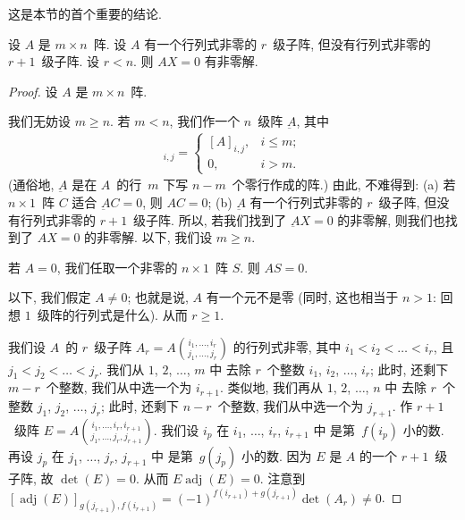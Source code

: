 这是本节的首个重要的结论.

\begin{theorem}
    设 \(A\) 是 \(m \times n\)~阵.
    设 \(A\) 有一个行列式非零的 \(r\)~级子阵,
    但没有行列式非零的 \(r+1\)~级子阵.
    设 \(r < n\).
    则 \(AX = 0\) 有非零解.
\end{theorem}

\begin{proof}
    设 \(A\) 是 \(m \times n\)~阵.

    我们无妨设 \(m \geq n\).
    若 \(m < n\), 我们作一个 \(n\)~级阵 \(\underbar{A}\),
    其中
    \begin{align*}
        [\underbar{A}]_{i,j}
        = \begin{cases}
              [A]_{i,j}, & i \leq m; \\
              0,         & i > m.
          \end{cases}
    \end{align*}
    (通俗地, \(\underbar{A}\)
    是在 \(A\)~的行~\(m\) 下写 \(n-m\)~个零行作成的阵.)
    由此, 不难得到:
    (a)
    若 \(n \times 1\)~阵 \(C\) 适合 \(\underbar{A}C = 0\),
    则 \(AC = 0\);
    (b)
    \(\underbar{A}\) 有一个行列式非零的 \(r\)~级子阵,
    但没有行列式非零的 \(r+1\)~级子阵.
    所以, 若我们找到了 \(\underbar{A}X = 0\)
    的非零解,
    则我们也找到了 \(AX = 0\) 的非零解.
    以下, 我们设 \(m \geq n\).

    若 \(A = 0\),
    我们任取一个非零的 \(n \times 1\)~阵 \(S\).
    则 \(AS = 0\).

    以下, 我们假定 \(A \neq 0\);
    也就是说, \(A\) 有一个元不是零
    (同时, 这也相当于 \(n > 1\):
    回想 \(1\)~级阵的行列式是什么).
    从而 \(r \geq 1\).

    我们设 \(A\)~的 \(r\)~级子阵
    \(
    \displaystyle
    A_r = A\binom{i_1,\dots,i_r}{j_1,\dots,j_r}
    \)
    的行列式非零,
    其中 \(i_1 < i_2 < \dots < i_r\),
    且 \(j_1 < j_2 < \dots < j_r\).
    我们从 \(1\), \(2\), \(\dots\), \(m\) 中%
    去除 \(r\)~个整数
    \(i_1\), \(i_2\), \(\dots\), \(i_r\);
    此时, 还剩下 \(m-r\)~个整数,
    我们从中选一个为 \(i_{r+1}\).
    类似地,
    我们再从 \(1\), \(2\), \(\dots\), \(n\) 中%
    去除 \(r\)~个整数
    \(j_1\), \(j_2\), \(\dots\), \(j_r\);
    此时, 还剩下 \(n-r\)~个整数,
    我们从中选一个为 \(j_{r+1}\).
    作 \(r+1\)~级阵
    \(
    \displaystyle
    E =
    A\binom{i_1,\dots,i_r,i_{r+1}}
    {j_1,\dots,j_r,j_{r+1}}
    \).
    我们设 \(i_p\) 在
    \(i_1\), \(\dots\), \(i_r\), \(i_{r+1}\) 中%
    是第~\(f(i_p)\) 小的数.
    再设 \(j_p\) 在
    \(j_1\), \(\dots\), \(j_r\), \(j_{r+1}\) 中%
    是第~\(g(j_p)\) 小的数.
    因为 \(E\) 是 \(A\) 的一个 \(r+1\)~级子阵,
    故 \(\det {(E)} = 0\).
    从而
    \(E \operatorname{adj} {(E)} = 0\).
    注意到
    \([\operatorname{adj} {(E)}]_{g(j_{r+1}), f(i_{r+1})}
    = (-1)^{f(i_{r+1})+g(j_{r+1})} \det {(A_r)} \neq 0\).


\end{proof}
